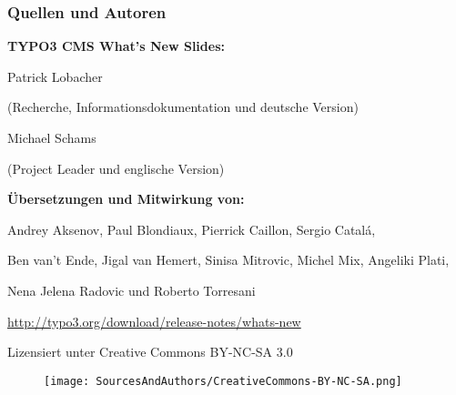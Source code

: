 \begin{frame}[fragile]
	\frametitle{Quellen und Autoren}

	\vspace{-0.6cm}

	\centerline{\textbf{TYPO3 CMS What's New Slides:}}

	\begin{center}
		\smaller
			\centerline{Patrick Lobacher}
			\centerline{(Recherche, Informationsdokumentation und deutsche Version)}
			\vspace{0.1cm}
			\centerline{Michael Schams}
			\centerline{(Project Leader und englische Version)}
		\normalsize
	\end{center}
	\vspace{-0.6cm}
	\begin{center}
		\smaller
			\centerline{\textbf{Übersetzungen und Mitwirkung von:}}
			\centerline{Andrey Aksenov, Paul Blondiaux, Pierrick Caillon, Sergio Catalá,}
			\centerline{Ben van't Ende, Jigal van Hemert, Sinisa Mitrovic, Michel Mix, Angeliki Plati,}
			\centerline{Nena Jelena Radovic und Roberto Torresani}
		\normalsize
	\end{center}
	\vspace{-0.6cm}
	\smaller\begin{center}\url{http://typo3.org/download/release-notes/whats-new}\end{center}\normalsize

	\smaller\begin{center}Lizensiert unter Creative Commons BY-NC-SA 3.0\end{center}\normalsize
	\begin{figure}\vspace*{-0.3cm}
		\texttt{[image: SourcesAndAuthors/CreativeCommons-BY-NC-SA.png]}
	\end{figure}

\end{frame}

